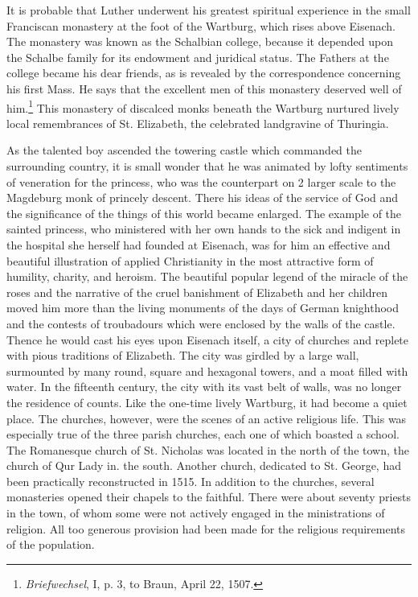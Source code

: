 It is probable that Luther underwent his greatest spiritual experience in the small Franciscan monastery at the foot of the Wartburg,
which rises above Eisenach. The monastery was known as the Schalbian college, because it depended upon the Schalbe family for its endowment and juridical status. The Fathers at the college became his
dear friends, as is revealed by the correspondence concerning his first
Mass. He says that the excellent men of this monastery deserved well
of him.\footnote{\textit{Briefwechsel}, I, p. 3, to Braun, April 22, 1507.}
This monastery of discalced monks beneath the Wartburg
nurtured lively local remembrances of St. Elizabeth, the celebrated
landgravine of Thuringia.

As the talented boy ascended the towering castle which commanded
the surrounding country, it is small wonder that he was animated by
lofty sentiments of veneration for the princess, who was the counterpart on 2 larger scale to the Magdeburg monk of princely descent.
There his ideas of the service of God and the significance of the things
of this world became enlarged. The example of the sainted princess,
who ministered with her own hands to the sick and indigent in the
hospital she herself had founded at Eisenach, was for him an effective
and beautiful illustration of applied Christianity in the most attractive form of humility, charity, and heroism. The beautiful popular
legend of the miracle of the roses and the narrative of the cruel banishment of Elizabeth and her children moved him more than the living
monuments of the days of German knighthood and the contests of
troubadours which were enclosed by the walls of the castle. Thence
he would cast his eyes upon Eisenach itself, a city of churches and replete with pious traditions of Elizabeth. The city was girdled by a
large wall, surmounted by many round, square and hexagonal towers,
and a moat filled with water. In the fifteenth century, the city with
its vast belt of walls, was no longer the residence of counts. Like the
one-time lively Wartburg, it had become a quiet place. The churches,
however, were the scenes of an active religious life. This was especially
true of the three parish churches, each one of which boasted a school.
The Romanesque church of St. Nicholas was located in the north of
the town, the church of Qur Lady in. the south. Another church,
dedicated to St. George, had been practically reconstructed in 1515.
In addition to the churches, several monasteries opened their chapels
to the faithful. There were about seventy priests in the town, of whom
some were not actively engaged in the ministrations of religion. All
too generous provision had been made for the religious requirements
of the population.


